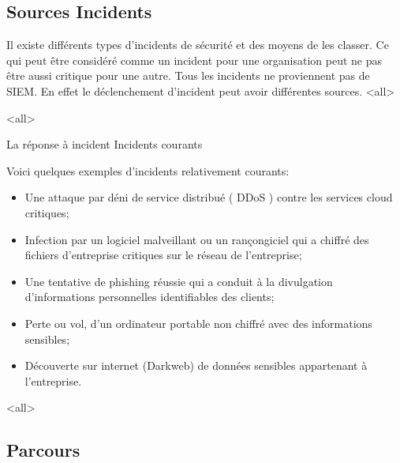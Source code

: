 \subsection{Sources Incidents}

Il existe différents types d'incidents de sécurité et des moyens de les classer. Ce qui peut être considéré comme un incident pour une organisation peut ne pas être aussi critique pour une autre. Tous les incidents ne proviennent pas de SIEM. En effet le déclenchement d'incident peut avoir différentes sources.
\mode<all>{}


\mode<all>{\texframe
{La réponse à incident}
{Incidents courants}
{%
Voici quelques exemples d'incidents relativement courants:

\begin{itemize}
  \item Une attaque par déni de service distribué ( DDoS ) contre les services cloud critiques;
  \item  Infection par un logiciel malveillant ou un rançongiciel qui a chiffré des fichiers d'entreprise critiques sur le réseau de l'entreprise;
  \item Une tentative de phishing réussie qui a conduit à la divulgation d'informations personnelles identifiables des clients;
  \item Perte ou vol, d'un ordinateur portable non chiffré avec des informations sensibles;
  \item Découverte sur internet (Darkweb) de données sensibles appartenant à l'entreprise.
\end{itemize}
}} %



\mode<all>{}

\subsection{Parcours}

